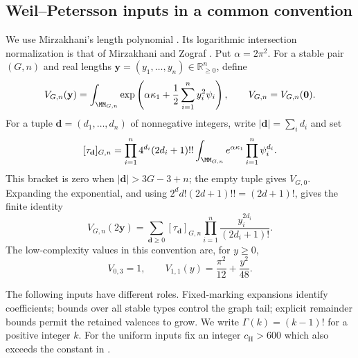 \subsection{Weil–Petersson inputs in a common convention}
\label{subsec:s03:01}

We use Mirzakhani's length polynomial \cite[Theorem~4.4]{Mir07}.
Its logarithmic intersection normalization is that of Mirzakhani and
Zograf \cite[Section~2]{MZ15}. Put $\alpha=2\pi^2$.
For a stable pair $(G,n)$ and real lengths
$\mathbf y=(y_1,\ldots,y_n)\in\mathbb R_{\geq0}^n$, define
\begin{equation}
\label{eq:s03:wp-definition}
V_{G,n}(\mathbf y)
=\int_{\MM_{G,n}}\exp\left(\alpha\kappa_1+
  \frac12\sum_{i=1}^ny_i^2\psi_i\right),
\qquad V_{G,n}=V_{G,n}(\mathbf0).
\end{equation}
For a tuple $\mathbf d=(d_1,\ldots,d_n)$ of nonnegative integers, write
$|\mathbf d|=\sum_i d_i$ and set
\begin{equation}
\label{eq:s03:descendants}
[\tau_{\mathbf d}]_{G,n}
=\prod_{i=1}^n4^{d_i}(2d_i+1)!!
  \int_{\MM_{G,n}}e^{\alpha\kappa_1}\prod_{i=1}^n\psi_i^{d_i}.
\end{equation}
This bracket is zero when $|\mathbf d|>3G-3+n$; the empty tuple gives
$V_{G,0}$. Expanding the exponential, and using
$2^d d!(2d+1)!!=(2d+1)!$, gives the finite identity
\begin{equation}
\label{eq:s03:length-polynomial}
V_{G,n}(2\mathbf y)
=\sum_{\mathbf d\geq0}[\tau_{\mathbf d}]_{G,n}
  \prod_{i=1}^n\frac{y_i^{2d_i}}{(2d_i+1)!}.
\end{equation}
The low-complexity values in this convention are, for $y\geq0$,
\begin{equation}
\label{eq:s03:low-types}
V_{0,3}=1,\qquad
V_{1,1}(y)=\frac{\pi^2}{12}+\frac{y^2}{48}.
\end{equation}

The following inputs have different roles. Fixed-marking expansions
identify coefficients; bounds over all stable types control the graph
tail; explicit remainder bounds permit the retained valences to grow.
We write $\Gamma(k)=(k-1)!$ for a positive integer $k$.
For the uniform inputs fix an integer $c_{\mathrm H}>600$ which also
exceeds the constant in \cite[Lemma~2.6]{HMT25}.

